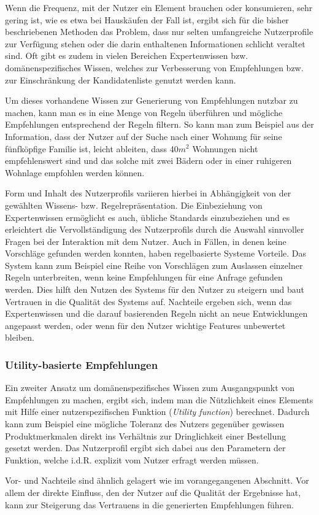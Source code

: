 Wenn die Frequenz, mit der Nutzer ein Element brauchen oder konsumieren, sehr gering ist, wie es etwa bei Hauskäufen der Fall ist, ergibt sich für die bisher beschriebenen Methoden das Problem, dass nur selten umfangreiche Nutzerprofile zur Verfügung stehen oder die darin enthaltenen Informationen schlicht veraltet sind. Oft gibt es zudem in vielen Bereichen Expertenwissen bzw. domänenspezifisches Wissen, welches zur Verbesserung von Empfehlungen bzw. zur Einschränkung der Kandidatenliste genutzt werden kann.

Um dieses vorhandene Wissen zur Generierung von Empfehlungen nutzbar zu machen, kann man es in eine Menge von Regeln überführen und mögliche Empfehlungen entsprechend der Regeln filtern. So kann man zum Beispiel aus der Information, dass der Nutzer auf der Suche nach einer Wohnung für seine fünfköpfige Familie ist, leicht ableiten, dass 40$m^{2}$ Wohnungen nicht empfehlenswert sind und das solche mit zwei Bädern oder in einer ruhigeren Wohnlage empfohlen werden können.

Form und Inhalt des Nutzerprofils variieren hierbei in Abhängigkeit von der gewählten Wissens- bzw. Regelrepräsentation. Die Einbeziehung von Expertenwissen ermöglicht es auch, übliche Standards einzubeziehen und es erleichtert die Vervollständigung des Nutzerprofils durch die Auswahl sinnvoller Fragen bei der Interaktion mit dem Nutzer. Auch in Fällen, in denen keine Vorschläge gefunden werden konnten, haben regelbasierte Systeme Vorteile. Das System kann zum Beispiel eine Reihe von Vorschlägen zum Auslassen einzelner Regeln unterbreiten, wenn keine Empfehlungen für eine Anfrage gefunden werden. Dies hilft den Nutzen des Systems für den Nutzer zu steigern und baut Vertrauen in die Qualität des Systems auf. Nachteile ergeben sich, wenn das Expertenwissen und die darauf basierenden Regeln nicht an neue Entwicklungen angepasst werden, oder wenn für den Nutzer wichtige Features unbewertet bleiben. \citep[Kap. 4]{rs}

\subsubsection{Utility-basierte Empfehlungen}

Ein zweiter Ansatz um domänenspezifisches Wissen zum Ausgangspunkt von Empfehlungen zu machen, ergibt sich, indem man die Nützlichkeit eines Elements mit Hilfe einer nutzerspezifischen Funktion (\textit{Utility function}) berechnet. Dadurch kann zum Beispiel eine mögliche Toleranz des Nutzers gegenüber gewissen Produktmerkmalen direkt ins Verhältnis zur Dringlichkeit einer Bestellung gesetzt werden. Das Nutzerprofil ergibt sich dabei aus den Parametern der Funktion, welche i.d.R. explizit vom Nutzer erfragt werden müssen.

Vor- und Nachteile sind ähnlich gelagert wie im vorangegangenen Abschnitt. Vor allem der direkte Einfluss, den der Nutzer auf die Qualität der Ergebnisse hat, kann zur Steigerung das Vertrauens in die generierten Empfehlungen führen.  \citep[Kap. 1]{hb} \citep{Burke:2002:HRS:586321.586352, hb_20}





